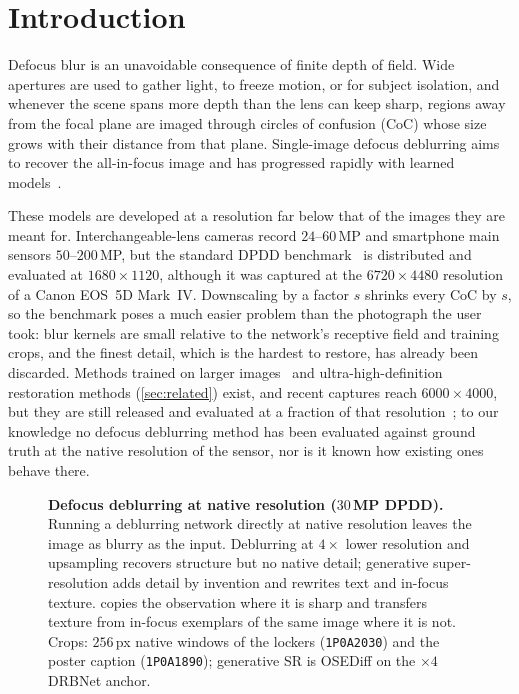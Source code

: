 \section{Introduction}
\label{sec:intro}

Defocus blur is an unavoidable consequence of finite depth of field. Wide apertures are used to
gather light, to freeze motion, or for subject isolation, and whenever the scene spans more depth
than the lens can keep sharp, regions away from the focal plane are imaged through circles of
confusion (CoC) whose size grows with their distance from that plane. Single-image defocus
deblurring aims to recover the all-in-focus image and has progressed rapidly with learned
models~\cite{abuolaim2020dpdd,son2021kpac,lee2021ifan,ruan2022drbnet,quan2023nrknet,zamir2022restormer,ruan2023lakdnet}.

These models are developed at a resolution far below that of the images they are meant for.
Interchangeable-lens cameras record $24$--$60$\,MP and smartphone main sensors $50$--$200$\,MP, but
the standard DPDD benchmark~\cite{abuolaim2020dpdd} is distributed and evaluated at
$1680\times1120$, although it was captured at the $6720\times4480$ resolution of a Canon EOS~5D
Mark~IV. Downscaling by a factor $s$ shrinks every CoC by $s$, so the benchmark poses a much easier
problem than the photograph the user took: blur kernels are small relative to the network's receptive
field and training crops, and the finest detail, which is the hardest to restore, has already been
discarded. Methods trained on larger images~\cite{seizinger2025bokehlicious} and ultra-high-definition
restoration methods (\cref{sec:related}) exist, and recent captures reach $6000\times4000$, but they are still
released and evaluated at a fraction of that resolution~\cite{seizinger2026realdefocus}; to our knowledge no defocus deblurring method has been
evaluated against ground truth at the native resolution of the sensor, nor is it known how existing ones
behave there.

\begin{figure}[t]
  \centering
  
  \caption{\textbf{Defocus deblurring at native resolution ($30$\,MP DPDD).}
  Running a deblurring network directly at native resolution leaves the image as blurry as the input.
  Deblurring at $4\times$ lower resolution and upsampling recovers structure but no native detail;
  generative super-resolution adds detail by invention and rewrites text and in-focus texture.
  \method copies the observation where it is sharp and transfers texture from in-focus exemplars of
  the same image where it is not. Crops: $256$\,px native windows of the lockers (\texttt{1P0A2030}) and the poster caption
  (\texttt{1P0A1890}); generative SR is OSEDiff on the $\times4$ DRBNet anchor. }
  \label{fig:teaser}
\end{figure}

